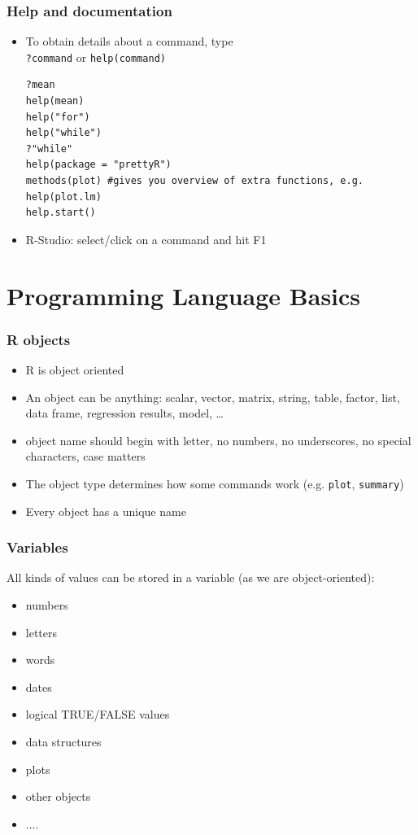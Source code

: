 \documentclass[xcolor={svgnames},10pt,
handout
]{beamer}
\begin{document}
\begin{frame}[fragile]
\frametitle{Help and documentation}
\begin{itemize}
	\item To obtain details about a command, type\\ \lstinline|?command| or \lstinline|help(command)|
\begin{lstlisting}
?mean
help(mean)
help("for")
help("while")
?"while"
help(package = "prettyR")
methods(plot) #gives you overview of extra functions, e.g. 
help(plot.lm)
help.start()
\end{lstlisting}
\item R-Studio: select/click on a command and hit F1
\end{itemize}
\end{frame}

\section{Programming Language Basics}

\begin{frame}[fragile]
\frametitle{R objects}
\begin{itemize}
\item R is object oriented
\item An object can be anything: scalar, vector, matrix, string, table, factor, list, data frame, regression results, model, \ldots
\item object name should begin with letter, no numbers, no underscores, no special characters, case matters
\item The object type determines how some commands work (e.g. \lstinline|plot|, \lstinline|summary|)
\item Every object has a unique name
\end{itemize}
\end{frame}




\begin{frame}\frametitle{Variables}
All kinds of values can be stored in a variable (as we are object-oriented):
\begin{itemize}
\item numbers
\item letters
\item words
\item dates
\item logical TRUE/FALSE values
\item data structures
\item plots
\item other objects
\item ....
\end{itemize}
\end{frame}
\end{document}
